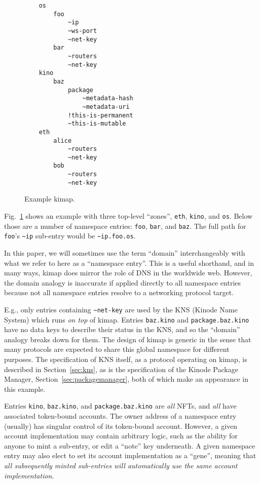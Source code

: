\documentclass[runningheads]{llncs}
\begin{document}
\begin{figure}[H]
    \centering
    \begin{verbatim}
    os
        foo
            ~ip
            ~ws-port
            ~net-key
        bar
            ~routers
            ~net-key
    kino
        baz
            package
                ~metadata-hash
                ~metadata-uri
            !this-is-permanent
            ~this-is-mutable
    eth
        alice
            ~routers
            ~net-key
        bob
            ~routers
            ~net-key
    \end{verbatim}
    \caption{Example kimap.}
    \label{fig:example kimap}
\end{figure}

Fig.~\ref{fig:example kimap} shows an example with three top-level ``zones'', \verb|eth|, \verb|kino|, and \verb|os|.
Below those are a number of namespace entries: \verb|foo|, \verb|bar|, and \verb|baz|.
The full path for \verb|foo|'s \verb|~ip| sub-entry would be \verb|~ip.foo.os|.

In this paper, we will sometimes use the term ``domain'' interchangeably with what we refer to here as a ``namespace entry''.
This is a useful shorthand, and in many ways, kimap does mirror the role of DNS in the worldwide web.
However, the domain analogy is inaccurate if applied directly to all namespace entries because not all namespace entries resolve to a networking protocol target.

E.g., only entries containing \verb|~net-key| are used by the KNS (Kinode Name System) which runs \textit{on top} of kimap.
Entries \verb|baz.kino| and \verb|package.baz.kino| have no data keys to describe their status in the KNS, and so the ``domain'' analogy breaks down for them.
The design of kimap is generic in the sense that many protocols are expected to share this global namespace for different purposes.
The specification of KNS itself, as a protocol operating on kimap, is described in Section~\ref{sec:kns}, as is the specification of the Kinode Package Manager, Section~\ref{sec:packagemanager}, both of which make an appearance in this example.

Entries \verb|kino|, \verb|baz.kino|, and \verb|package.baz.kino| are \textit{all} NFTs, and \textit{all} have associated token-bound accounts.
The owner address of a namespace entry (usually) has singular control of its token-bound account.
However, a given account implementation may contain arbitrary logic, such as the ability for anyone to mint a sub-entry, or edit a ``note'' key underneath.
A given namespace entry may also elect to set its account implementation as a ``gene'', meaning that \textit{all subsequently minted sub-entries will automatically use the same account implementation}.
\end{document}
